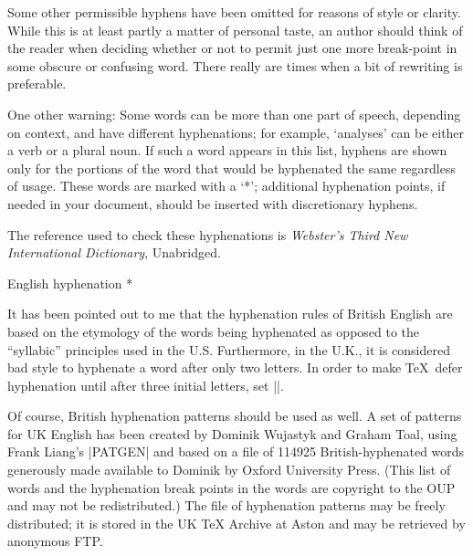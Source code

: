 Some other permissible hyphens have been omitted
for reasons of style or clarity.  While this is at
least partly a matter of personal taste, an author should think of the
reader when deciding whether or not to permit just one more break-point
in some obscure or confusing word.  There really are times when a bit of
rewriting is preferable.

One other warning: Some words can be more than one part of speech,
depending on context, and have different hyphenations; for example,
`analyses' can be either a verb or a plural noun.  If such a word appears
in this list, hyphens are shown only for the portions of the word that
would be hyphenated the same regardless of usage.  These words are marked
with a `*'; additional hyphenation points, if needed in your document,
should be inserted with discretionary hyphens.

The reference used to check these hyphenations is {\sl Webster's
Third New International Dictionary}, Unabridged.

\head * English hyphenation *

It has been pointed out to me that the hyphenation rules of British English
are based on the etymology of the words being hyphenated as opposed to
the ``syllabic'' principles used in the U.S\null.  Furthermore, in the
U.K., it is considered bad style to hyphenate a word after only two letters.
In order to make \TeX\ defer hyphenation until after three initial letters,
set ||.

Of course, British hyphenation patterns should be used as well.
A set of patterns for UK English has been created by Dominik Wujastyk and
Graham Toal, using Frank Liang's |PATGEN| and based on a file of 114925
British-hyphenated words generously made available to Dominik by Oxford
University Press.  (This list of words and the hyphenation break points
in the words are copyright to the OUP and may not be redistributed.)
The file of hyphenation patterns may be freely distributed; it is stored
in the UK \TeX{} Archive at Aston and may be retrieved by anonymous FTP.


%
%

